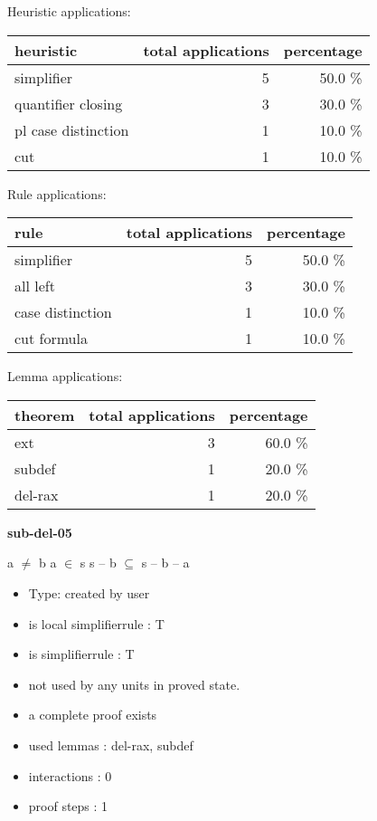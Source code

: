 \documentclass[a4paper]{article}
\begin{document}
\medskip


Heuristic applications:

\begin{supertabular}{l|r|r}
heuristic	& total applications & percentage \\ \hline
simplifier & 5 & 50.0 \% \\
quantifier closing & 3 & 30.0 \% \\
pl case distinction & 1 & 10.0 \% \\
cut & 1 & 10.0 \% \\

\end{supertabular}

Rule applications:

\begin{supertabular}{l|r|r}
rule	        & total applications & percentage \\ \hline
simplifier & 5 & 50.0 \% \\
all left & 3 & 30.0 \% \\
case distinction & 1 & 10.0 \% \\
cut formula & 1 & 10.0 \% \\

\end{supertabular}

Lemma applications:

\begin{supertabular}{l|r|r}
theorem	        & total applications & percentage \\ \hline
ext & 3 & 60.0 \% \\
subdef & 1 & 20.0 \% \\
del-rax & 1 & 20.0 \% \\

\end{supertabular}
\pagebreak

{\LARGE\bf sub-del-05}\label{lemma-sub-del-05}

\medskip

 \Fol a $\neq$ b \And \Not a $\in$ s \Imp s -- b $\subseteq$ s -- b -- a

\begin{itemize}

\item Type: created by user

\item is local simplifierrule : T
\item is simplifierrule : T
\item not used by any units in proved state.
\item       a complete proof exists
\item       used lemmas  : del-rax, subdef
\item       interactions : 0
\item       proof steps  : 1
\end{itemize}
\end{document}
